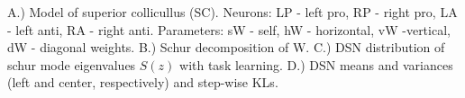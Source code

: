 A.) Model of superior collicullus (SC). Neurons: LP - left pro, RP - right pro, LA - left anti, RA - right anti.  Parameters: sW - self, hW - horizontal, vW -vertical, dW - diagonal weights.  B.) Schur decomposition of W.  C.) DSN distribution of schur mode eigenvalues $S(z)$ with task learning.  D.) DSN means and variances (left and center, respectively) and step-wise KLs.